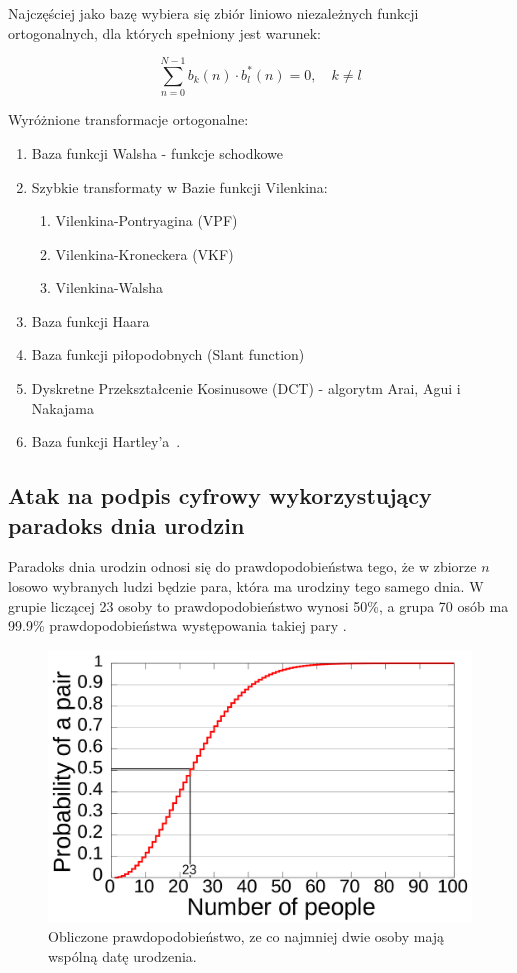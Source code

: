 \documentclass[wi]{zut}
\begin{document}
Najczęściej jako bazę wybiera się zbiór liniowo niezależnych funkcji ortogonalnych, dla których spełniony jest warunek:

\begin{equation}
    \sum_{n=0}^{N-1} b_{k}(n) \cdot b_{l}^{*}(n)=0, \quad k \neq l
\end{equation}

Wyróżnione transformacje ortogonalne:

\begin{enumerate}
    \item Baza funkcji Walsha - funkcje schodkowe
    \item Szybkie transformaty w Bazie funkcji Vilenkina:
    \begin{enumerate}
        \item Vilenkina-Pontryagina (VPF)
        \item Vilenkina-Kroneckera (VKF)
        \item Vilenkina-Walsha
    \end{enumerate}
    \item Baza funkcji Haara
    \item Baza funkcji piłopodobnych (Slant function)
    \item Dyskretne Przekształcenie Kosinusowe (DCT) - algorytm Arai, Agui i Nakajama
    \item Baza funkcji Hartley'a~\cite{Cariow_6}.
\end{enumerate}

\subsection{Atak na podpis cyfrowy wykorzystujący paradoks dnia urodzin}

Paradoks dnia urodzin odnosi się do prawdopodobieństwa tego, że w zbiorze $n$ losowo wybranych ludzi będzie para, która ma urodziny tego samego dnia. W grupie liczącej 23 osoby to prawdopodobieństwo wynosi 50\%, a grupa 70 osób ma 99.9\% prawdopodobieństwa występowania takiej pary \cite{wiki:Birthday_problem}.


\begin{figure}[H]
    \centering
    \includegraphics[width=0.5\linewidth]{images/Birthday_Paradox.svg.png}
    \caption{Obliczone prawdopodobieństwo, ze co najmniej dwie osoby mają wspólną datę urodzenia.}
    \label{fig:birthdaj}
\end{figure}
\end{document}
